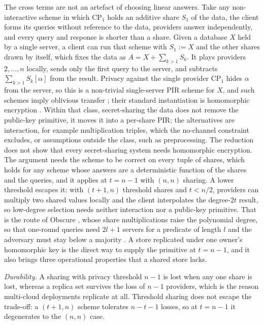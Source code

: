 \documentclass[a4paper,fleqn]{cas-sc}
\begin{document}
The cross terms are not an artefact of choosing linear answers. Take any
non-interactive scheme in which $\text{CP}_1$ holds an additive share $S_1$ of
the data, the client forms its queries without reference to the data,
providers answer independently, and every query and response is shorter than a
share. Given a database $X$ held by a single server, a client
can run that scheme with $S_1:=X$ and the other shares drawn by itself, which
fixes the data as $A=X+\sum_{k>1}S_k$. It plays providers $2,\dots,n$ locally,
sends only the first query to the server, and subtracts $\sum_{k>1}S_k[\alpha]$
from the result. Privacy against the single provider $\text{CP}_1$ hides
$\alpha$ from the server, so this is a non-trivial single-server PIR scheme for
$X$, and such schemes imply oblivious transfer \citep{dicrescenzo2000single};
their standard instantiation is homomorphic encryption
\citep{kushilevitz1997replication}. Within that class, secret-sharing the data
does not remove the public-key primitive, it moves it into a per-share PIR; the
alternatives are interaction, for example multiplication triples, which the
no-channel constraint excludes, or assumptions outside the class, such as
preprocessing. The reduction does not show that every secret-sharing system
needs homomorphic encryption. The argument needs the
scheme to be correct on every tuple of shares, which holds for any scheme whose
answers are a deterministic function of the shares and the queries, and it
applies at $t=n-1$ with $(n,n)$ sharing. A lower threshold escapes it: with
$(t{+}1,n)$ threshold shares and $t<n/2$, providers can multiply two shared
values locally and the client interpolates the degree-$2t$ result, so
low-degree selection needs neither interaction nor a public-key primitive. That
is the route of Obscure \citep{gupta2020obscure}, whose share
multiplications raise the polynomial degree, so that one-round queries need
$2l+1$ servers for a predicate of length $l$ and the adversary must stay below
a majority \citep[\S2.1, \S3.2]{gupta2020obscure}. A store replicated
under one owner's homomorphic key is the direct way to supply the primitive at
$t=n-1$, and it also brings three operational properties that a shared store
lacks.

\emph{Durability.} A sharing with privacy threshold $n-1$ is lost when any one
share is lost, whereas a replica set survives the loss of $n-1$ providers,
which is the reason multi-cloud deployments replicate at all. Threshold
sharing does not escape the trade-off: a $(t{+}1,n)$ scheme tolerates
$n-t-1$ losses, so at $t=n-1$ it degenerates to the $(n,n)$ case.
\end{document}
